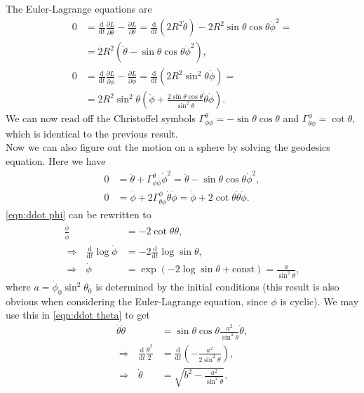 \documentclass[english, parskip=full]{scrartcl}
\newcommand{\kla}{}
\newcommand{\tecxt}{}
\begin{document}
The Euler-Lagrange equations are
\begin{align}
0 &= \frac{\tecxt\text{d}}{\tecxt\text{d}t}\frac{\partial L}{\partial \dot{\theta}} - \frac{\partial L}{\partial \theta} = \frac{\tecxt\text{d}}{\tecxt\text{d}t} \kla\left( 2R^2\dot{\theta} \right) - 2R^2\sin\theta\cos\theta\dot{\phi}^2 = \\
&= 2R^2\kla\left( \ddot{\theta} - \sin\theta\cos\theta\dot{\phi}^2 \right),\\
0 &= \frac{\tecxt\text{d}}{\tecxt\text{d}t}\frac{\partial L}{\partial \dot{\phi}} - \frac{\partial L}{\partial \phi} = \frac{\tecxt\text{d}}{\tecxt\text{d}t} \kla\left( 2R^2\sin^2\theta \dot{\phi} \right) = \\
&= 2R^2\sin^2\theta\kla\left( \ddot{\phi} + \frac{2\sin\theta\cos\theta}{\sin^2\theta} \dot{\theta}\dot{\phi} \right).
\end{align}
We can now read off the Christoffel symbols $\Gamma^\theta_{\phi\phi} = -\sin\theta\cos\theta$ and $\Gamma^\phi_{\theta\phi} = \cot\theta$, which is identical to the previous result.
\\
Now we can also figure out the motion on a sphere by solving the geodesics equation.
Here we have
\begin{align}
0 &= \ddot{\theta} + \Gamma^\theta_{\phi\phi}\dot{\phi}^2 = \ddot{\theta} - \sin\theta\cos\theta \dot{\phi}^2,\label{eqn:ddot theta} \\
0 &= \ddot{\phi} + 2\Gamma^\phi_{\theta\phi} \dot{\theta}\dot{\phi} = \ddot{\phi} + 2\cot\theta\dot{\theta}\dot{\phi}. \label{eqn:ddot phi}
\end{align}
\autoref{eqn:ddot phi} can be rewritten to
\begin{align}
\frac{\ddot{\phi}}{\dot{\phi}} &= -2\cot\theta\dot{\theta},\\
\Rightarrow\ \ \ \frac{\tecxt\text{d}}{\tecxt\text{d}t} \log\dot{\phi} &= -2\frac{\tecxt\text{d}}{\tecxt\text{d}t} \log \sin\theta,\\
\Rightarrow\ \ \ \dot{\phi} &= \exp\kla\left( -2\log\sin\theta + \tecxt\text{const} \right) = \frac{a}{\sin^2\theta},
\end{align}
where $a = \dot{\phi}_0 \sin^2\theta_0$ is determined by the initial conditions (this result is also obvious when considering the Euler-Lagrange equation, since $\phi$ is cyclic).
We may use this in \autoref{eqn:ddot theta} to get
\begin{align}
\ddot{\theta} \dot{\theta} &= \sin\theta\cos\theta \frac{a^2}{\sin^4\theta} \dot{\theta},\\
\Rightarrow\ \ \ \frac{\tecxt\text{d}}{\tecxt\text{d}t} \frac{\dot{\theta}^2}{2} &= \frac{\tecxt\text{d}}{\tecxt\text{d}t} \kla\left( -\frac{a^2}{2\sin^2\theta} \right),\\
\Rightarrow\ \ \ \dot{\theta} &= \sqrt{b^2 - \frac{a^2}{\sin^2\theta}},
\end{align}
\end{document}
